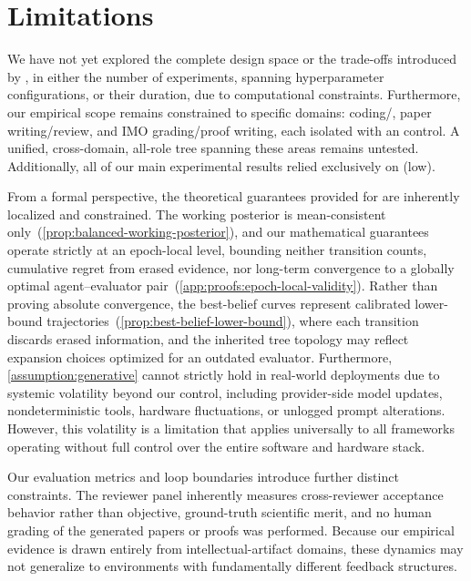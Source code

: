 



\section{Limitations}
\label{app:limitations}

We have not yet explored the complete design space or the trade-offs introduced by \theourmethod, in either the number of experiments, spanning hyperparameter configurations, or their duration, due to computational constraints. Furthermore, our empirical scope remains constrained to specific domains: coding/\polyglot, paper writing/review, and IMO grading/proof writing, each isolated with an \hgmh control. A unified, cross-domain, all-role tree spanning these areas remains untested. Additionally, all of our main experimental results relied exclusively on \gptlow (low).

From a formal perspective, the theoretical guarantees provided for \ourmethod are inherently localized and constrained. The working posterior is mean-consistent only~(\cref{prop:balanced-working-posterior}), and our mathematical guarantees operate strictly at an epoch-local level, bounding neither transition counts, cumulative regret from erased evidence, nor long-term convergence to a globally optimal agent--evaluator pair~(\cref{app:proofs:epoch-local-validity}). Rather than proving absolute convergence, the best-belief curves represent calibrated lower-bound trajectories~(\cref{prop:best-belief-lower-bound}), where each transition discards erased information, and the inherited tree topology may reflect expansion choices optimized for an outdated evaluator. Furthermore, \cref{assumption:generative} cannot strictly hold in real-world deployments due to systemic volatility beyond our control, including provider-side model updates, nondeterministic tools, hardware fluctuations, or unlogged prompt alterations. However, this volatility is a limitation that applies universally to all frameworks operating without full control over the entire software and hardware stack.

Our evaluation metrics and loop boundaries introduce further distinct constraints. The reviewer panel inherently measures cross-reviewer acceptance behavior rather than objective, ground-truth scientific merit, and no human grading of the generated papers or proofs was performed. Because our empirical evidence is drawn entirely from intellectual-artifact domains, these dynamics may not generalize to environments with fundamentally different feedback structures.

